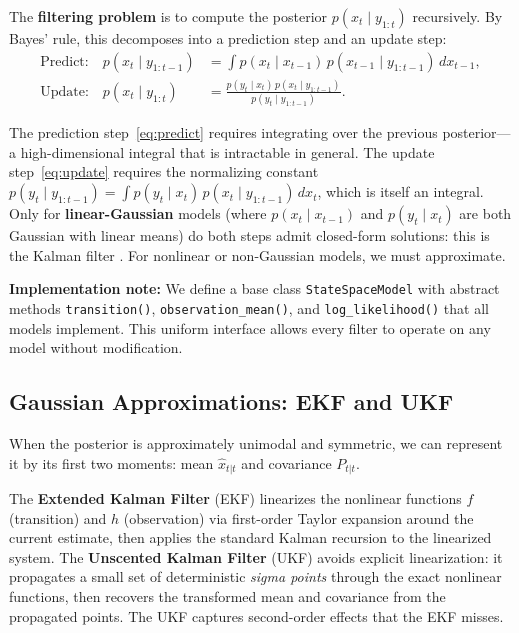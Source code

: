 \documentclass[12pt,a4paper]{article}
\theoremstyle{definition}
\theoremstyle{remark}
\begin{document}
The \textbf{filtering problem} is to compute the posterior $p(x_t \mid y_{1:t})$ recursively. By Bayes' rule, this decomposes into a prediction step and an update step:
\begin{align}
	\text{Predict:} \quad p(x_t \mid y_{1:t-1}) &= \int p(x_t \mid x_{t-1}) \, p(x_{t-1} \mid y_{1:t-1}) \, dx_{t-1}, \label{eq:predict} \\
	\text{Update:} \quad p(x_t \mid y_{1:t}) &= \frac{p(y_t \mid x_t) \, p(x_t \mid y_{1:t-1})}{p(y_t \mid y_{1:t-1})}. \label{eq:update}
\end{align}

The prediction step~\eqref{eq:predict} requires integrating over the previous posterior---a high-dimensional integral that is intractable in general. The update step~\eqref{eq:update} requires the normalizing constant $p(y_t \mid y_{1:t-1}) = \int p(y_t \mid x_t) \, p(x_t \mid y_{1:t-1}) \, dx_t$, which is itself an integral. Only for \textbf{linear-Gaussian} models (where $p(x_t \mid x_{t-1})$ and $p(y_t \mid x_t)$ are both Gaussian with linear means) do both steps admit closed-form solutions: this is the Kalman filter \citep{kalman1960}. For nonlinear or non-Gaussian models, we must approximate.

\textbf{Implementation note:} We define a base class \texttt{StateSpaceModel} with abstract methods \texttt{transition()}, \texttt{observation\_mean()}, and \texttt{log\_likelihood()} that all models implement. This uniform interface allows every filter to operate on any model without modification.

\subsection{Gaussian Approximations: EKF and UKF}

When the posterior is approximately unimodal and symmetric, we can represent it by its first two moments: mean $\hat{x}_{t|t}$ and covariance $P_{t|t}$.

The \textbf{Extended Kalman Filter} (EKF) \citep{barshalom2001} linearizes the nonlinear functions $f$ (transition) and $h$ (observation) via first-order Taylor expansion around the current estimate, then applies the standard Kalman recursion to the linearized system. The \textbf{Unscented Kalman Filter} (UKF) \citep{julier2004} avoids explicit linearization: it propagates a small set of deterministic \emph{sigma points} through the exact nonlinear functions, then recovers the transformed mean and covariance from the propagated points. The UKF captures second-order effects that the EKF misses.
\end{document}
